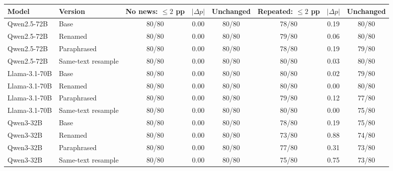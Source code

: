 \begin{tabular}{@{}llcccccc@{}}
\toprule
Model & Version & No news: $\leq2$ pp & $|\Delta p|$ & Unchanged & Repeated: $\leq2$ pp & $|\Delta p|$ & Unchanged \\
\midrule
Qwen2.5-72B & Base & 80/80 & 0.00 & 80/80 & 78/80 & 0.19 & 80/80 \\
Qwen2.5-72B & Renamed & 80/80 & 0.00 & 80/80 & 79/80 & 0.06 & 80/80 \\
Qwen2.5-72B & Paraphrased & 80/80 & 0.00 & 80/80 & 78/80 & 0.19 & 79/80 \\
Qwen2.5-72B & Same-text resample & 80/80 & 0.00 & 80/80 & 80/80 & 0.03 & 80/80 \\
Llama-3.1-70B & Base & 80/80 & 0.00 & 80/80 & 80/80 & 0.02 & 79/80 \\
Llama-3.1-70B & Renamed & 80/80 & 0.00 & 80/80 & 80/80 & 0.00 & 80/80 \\
Llama-3.1-70B & Paraphrased & 80/80 & 0.00 & 80/80 & 79/80 & 0.12 & 77/80 \\
Llama-3.1-70B & Same-text resample & 80/80 & 0.00 & 80/80 & 80/80 & 0.00 & 75/80 \\
Qwen3-32B & Base & 80/80 & 0.00 & 80/80 & 78/80 & 0.19 & 75/80 \\
Qwen3-32B & Renamed & 80/80 & 0.00 & 80/80 & 73/80 & 0.88 & 74/80 \\
Qwen3-32B & Paraphrased & 80/80 & 0.00 & 80/80 & 77/80 & 0.31 & 73/80 \\
Qwen3-32B & Same-text resample & 80/80 & 0.00 & 80/80 & 75/80 & 0.75 & 73/80 \\
\bottomrule
\end{tabular}
